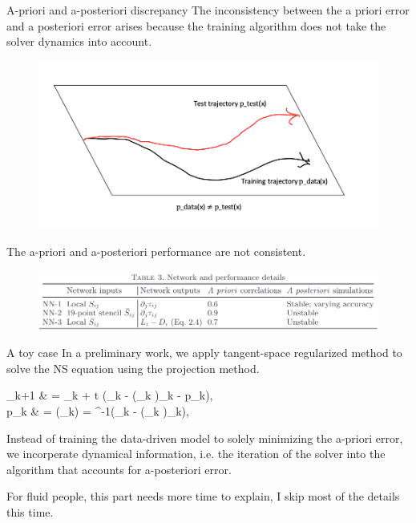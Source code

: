 \documentclass[paper slide]{beamer}
\begin{document}
\begin{frame}{A-priori and a-posteriori discrepancy}
	The inconsistency between the a priori error and a posteriori error arises because the {\color{red}training algorithm does not take the solver dynamics into account}.
	\begin{figure}
		\includegraphics[width=.6\textwidth]{fig/dilemma.png}
		\label{fig:dilemma}
	\end{figure}
	The a-priori and a-posteriori performance are not consistent.
	\begin{figure}
		\includegraphics[width=.8\textwidth]{fig/dichotomy.jpg}
		\label{fig:dichotomy}
	\end{figure}
\end{frame}

\begin{frame}{A toy case}
	In a preliminary work, we apply {\color{red}tangent-space regularized method} to solve the NS equation using the projection
	method. 
	\bequn
		\begin{aligned}
			\mfu_{k+1} 	& = \mfu_k +
			\Delta t (\nu \Delta \mfu_k
			- (\mfu_k \cdot \nabla)\mfu_k - \nabla p_{k}),    \\
			p_{k} & = \phi(\mfu_k) = \Delta^{-1}(\nabla \cdot \lp \nu \Delta \mfu_k
			- (\mfu_k \cdot \nabla)\mfu_k\rp),   \\
		\end{aligned}
	\eequn
	Instead of training the data-driven model to solely	minimizing the a-priori error, we incorperate
	{\color{red}dynamical information, i.e. the iteration of the solver} into the algorithm that accounts for a-posteriori error.

	{\color{blue}For fluid people, this part needs more time to explain, I skip most of the details this time.}
\end{frame}
\end{document}
